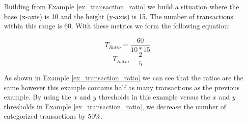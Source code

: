  \begin{example}
 \label{ex_transaction_ratio_2}
 Building from Example \ref{ex_transaction_ratio} we build a situation where the base (x-axis) is 10 and the height (y-axis) is 15. The number of transactions within this range is 60. With these metrics we form the following equation:
 
  \[\textrm{$T_{Ratio}$} =\frac{\textrm{60}}{10 * 15}\]
  \[\textrm{$T_{Ratio}$} =\frac{\textrm{2}}{5}\]
  
  As shown in Example \ref{ex_transaction_ratio} we can see that the ratios are the same however this example contains half as many transactions as the previous example. By using the $x$ and $y$ thresholds in this example versus the $x$ and $y$ thresholds in Example \ref{ex_transaction_ratio}, we decrease the number of categorized transactions by 50\%.
 
 \end{example}